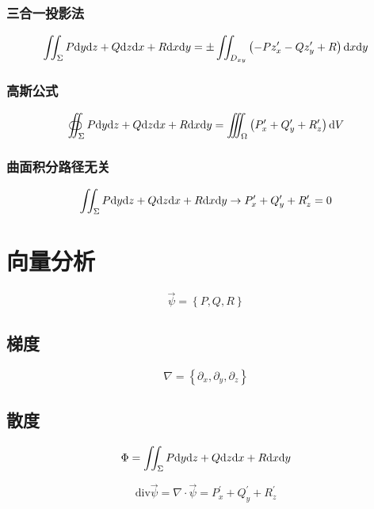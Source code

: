 \documentclass{article}
\begin{document}
\subsubsection{三合一投影法}

\[\iint_\Sigma P\mathrm d y\mathrm d z+Q\mathrm d z\mathrm d x+R\mathrm d x\mathrm d y=
    \pm\iint_{D_{xy}}
    \left(-Pz_x^\prime-Qz_y^\prime+R\right)
    \mathrm d x\mathrm d y\]

\subsubsection{高斯公式}

\[\oiint_\Sigma P\mathrm d y\mathrm d z+Q\mathrm d z\mathrm d x+R\mathrm d x\mathrm d y=
    \iiint_\Omega\left(P_x^\prime+Q_y^\prime+R_z^\prime\right)\mathrm d V\]

\subsubsection{曲面积分路径无关}

\[\iint_\Sigma P\mathrm d y\mathrm d z+Q\mathrm d z\mathrm d x+R\mathrm d x\mathrm d y
    \to P_x^\prime+Q_y^\prime+R_z^\prime=0\]

\section{向量分析}

\begin{definition}[向量场]
    \[\vec\psi=\left\{P,Q,R\right\}\]
\end{definition}

\subsection{梯度}

\begin{definition}[梯度]
    \[\nabla=\left\{\partial_x,\partial_y,\partial_z\right\}\]
\end{definition}

\subsection{散度}

\begin{definition}
    \[\Phi=\iint_\Sigma P\mathrm d y\mathrm d z+Q\mathrm d z\mathrm d x+R\mathrm d x\mathrm d y\]
\end{definition}

\begin{theorem}[散度]
    \[\mathrm{div}\vec\psi=
        \nabla\cdot\vec \psi=
        P_x^\prime+Q_y^\prime+R_z^\prime\]
\end{theorem}
\end{document}
